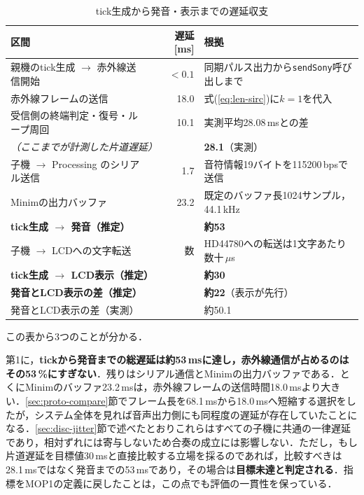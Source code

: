 \documentclass[uplatex,dvipdfmx]{jlreq}
\begin{document}
\begin{table}[tb]
\caption{tick生成から発音・表示までの遅延収支}
\label{tab:budget}
\begin{center}
\footnotesize
\begin{tabular}{lrp{15em}}
\hline
区間 & 遅延 [ms] & 根拠 \\
\hline
親機のtick生成 $\rightarrow$ 赤外線送信開始 & $<0.1$ & 同期パルス出力から\texttt{sendSony}呼び出しまで \\
赤外線フレームの送信 & 18.0 & 式(\ref{eq:len-sirc})に$k=1$を代入 \\
受信側の終端判定・復号・ループ周回 & 10.1 & 実測平均28.08\,msとの差 \\
\hline
\multicolumn{2}{l}{\textit{（ここまでが計測した片道遅延）}} & \textbf{28.1}（実測） \\
\hline
子機 $\rightarrow$ Processing のシリアル送信 & 1.7 & 音符情報19バイトを115200\,bpsで送信 \\
Minimの出力バッファ & 23.2 & 既定のバッファ長1024サンプル，44.1\,kHz \\
\hline
\multicolumn{2}{l}{\textbf{tick生成 $\rightarrow$ 発音（推定）}} & \textbf{約53} \\
\hline
子機 $\rightarrow$ LCDへの文字転送 & 数 & HD44780への転送は1文字あたり数十\,$\mu$s \\
\multicolumn{2}{l}{\textbf{tick生成 $\rightarrow$ LCD表示（推定）}} & \textbf{約30} \\
\hline
\multicolumn{2}{l}{\textbf{発音とLCD表示の差（推定）}} & \textbf{約22}（表示が先行） \\
\multicolumn{2}{l}{発音とLCD表示の差（実測）} & 約50.1 \\
\hline
\end{tabular}
\end{center}
\end{table}

この表から3つのことが分かる．

第1に，\textbf{tickから発音までの総遅延は約53\,msに達し，赤外線通信が占めるのはその53\,\%にすぎない}．残りはシリアル通信とMinimの出力バッファである．とくにMinimのバッファ23.2\,msは，赤外線フレームの送信時間18.0\,msより大きい．\ref{sec:proto-compare}節でフレーム長を68.1\,msから18.0\,msへ短縮する選択をしたが，システム全体を見れば音声出力側にも同程度の遅延が存在していたことになる．\ref{sec:disc-jitter}節で述べたとおりこれらはすべての子機に共通の一律遅延であり，相対ずれには寄与しないため合奏の成立には影響しない．ただし，もし片道遅延を目標値30\,msと直接比較する立場を採るのであれば，比較すべきは28.1\,msではなく発音までの53\,msであり，その場合は\textbf{目標未達と判定される}．指標をMOP1の定義に戻したことは，この点でも評価の一貫性を保っている．
\end{document}
